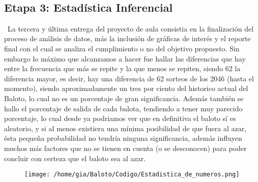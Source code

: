 \documentclass[11pt]{article}
\begin{document}
\
\subsection{Etapa 3: Estadística Inferencial}
\
La tercera y última entrega del proyecto de aula consistia en la finalización del proceso de análisis de datos, más la inclusión de gráficas de interés y el reporte final con el cual se analiza el cumplimiento o no del objetivo propuesto. Sin embargo lo máximo que alcanzamos a hacer fue hallar las diferencias que hay entre la frecuencia que más se repite y la que menos se repiten, siendo 62 la diferencia mayor, es decir, hay una diferencia de 62 sorteos de los 2046 (hasta el momento), siendo aproximadamente un tres por ciento del historico actual del Baloto, lo cual no es un porcentaje de gran significancia.
Además también se hallo el porcentaje de salida de cada balota, tendiendo a tener muy parecido porcentaje, lo cual desde ya podriamos ver que en definitiva el baloto sí es aleatorio, y si al menos existiera una mínima posibilidad de que fuera al azar, ésta pequeña probabilidad no tendría ninguna significancia, además influyen muchos más factores que no se tienen en cuenta (o se desconocen) para poder concluir con certeza que el baloto sea al azar. 

\begin{figure}[htp]
\centering
\texttt{[image: /home/gia/Baloto/Codigo/Estadistica\_de\_numeros.png]}
\caption{}
\label{}
\end{figure}
\end{document}

